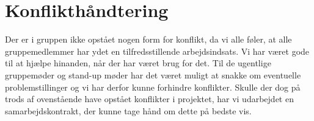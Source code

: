 \section{Konflikthåndtering}
Der er i gruppen ikke opstået nogen form for konflikt, da vi alle føler, at alle gruppemedlemmer har ydet en tilfredsstillende arbejdsindsats. Vi har været gode til at hjælpe hinanden, når der har været brug for det. Til de ugentlige gruppemøder og stand-up møder har det været muligt at snakke om eventuelle problemstillinger og vi har derfor kunne forhindre konflikter. Skulle der dog på trods af ovenstående have opstået konflikter i projektet, har vi udarbejdet en samarbejdskontrakt, der kunne tage hånd om dette på bedste vis. 